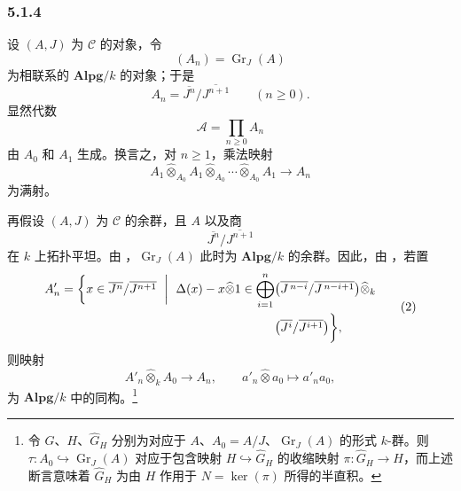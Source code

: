 
\subsubsection*{5.1.4}
\label{sga3:VIIB:5.1.4}

设 \((A,J)\) 为 \(\mathcal C\) 的对象，令
\[
  (A_n)=\operatorname{Gr}_J(A)
\]
为相联系的 \(\mathbf{Alpg}/k\) 的对象；于是
\[
  A_n=\overline{J^n}/\overline{J^{n+1}}
  \qquad(n\geq0).
\]
显然代数
\[
  \mathscr A=\prod_{n\geq0}A_n
\]
由 \(A_0\) 和 \(A_1\) 生成。换言之，对 \(n\geq1\)，乘法映射
\[
  A_1\widehat\otimes_{A_0}A_1
  \widehat\otimes_{A_0}\cdots
  \widehat\otimes_{A_0}A_1
  \longrightarrow A_n
  \tag{1}
  \label{sga3:VIIB:5.1.4:eq1}
\]
为满射。

再假设 \((A,J)\) 为 \(\mathcal C\) 的余群，且 \(A\) 以及商
\[
  \overline{J^n}/\overline{J^{n+1}}
\]
在 \(k\) 上拓扑平坦。由 ，\(\operatorname{Gr}_J(A)\) 此时为 \(\mathbf{Alpg}/k\) 的余群。因此，由 ，若置
\[
\begin{split}
  A'_n
  =
  \biggl\{
    x\in\overline{J^n}/\overline{J^{n+1}}
    \ \biggm|\
    \Delta(x)-x\widehat\otimes1
    \in
    \bigoplus_{i=1}^{n}
    &\bigl(
      \overline{J^{\,n-i}}/\overline{J^{\,n-i+1}}
    \bigr)
    \widehat\otimes_k
    \\
    &\bigl(
      \overline{J^i}/\overline{J^{i+1}}
    \bigr)
  \biggr\},
\end{split}
\tag{2}
\label{sga3:VIIB:5.1.4:eq2}
\]
则映射
\[
  A'_n\widehat\otimes_kA_0\longrightarrow A_n,
  \qquad
  a'_n\widehat\otimes a_0\longmapsto a'_na_0,
\]
为 \(\mathbf{Alpg}/k\) 中的同构。\footnote{%
\label{sga3:VIIB:nde:149}令 \(G\)、\(H\)、\(\widehat G_H\) 分别为对应于 \(A\)、\(A_0=A/J\)、\(\operatorname{Gr}_J(A)\) 的形式 \(k\)-群。则 \(\tau:A_0\hookrightarrow\operatorname{Gr}_J(A)\) 对应于包含映射 \(H\hookrightarrow\widehat G_H\) 的收缩映射 \(\pi:\widehat G_H\to H\)，而上述断言意味着 \(\widehat G_H\) 为由 \(H\) 作用于 \(N=\ker(\pi)\) 所得的半直积。}

